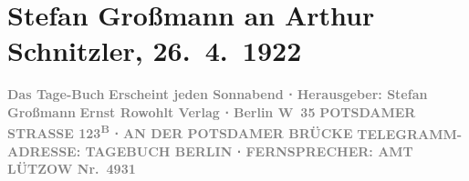 

         
         \newcommand{\erwaehntePersonen}{Personen: Felix Salten}
         \newcommand{\erwaehnteInstitutionen}{Institutionen: Das Tage-Buch, Ernst Rowohlt Verlag, Fernsprechamt Lietzow}
         \newcommand{\erwaehnteOrte}{Orte: Berlin, Deutschland, Potsdamerstraße, Wien, Österreich}
         \newcommand{\erwaehnteWerke}{Werke: Das Tage-Buch, Von der kleinen Liebe}
               \section[Stefan Großmann an Arthur Schnitzler, 26. 4. 1922]{ Stefan Großmann an Arthur Schnitzler, 26. 4. 1922}\nopagebreak{}\rehead{ }\begin{ledgroupsized}[t]{13cm}\normalsize\beginnumbering \toendnotes[C]{\smallbreak\pagebreak[2]} 
\toendnotes[C]{\smallbreak}\pstart
           \noindent{}\centering{}{\pb}\textcolor{gray}{\textbf{Das Tage-Buch}}\pend
           \pstart
           \noindent{}\centering{}\textcolor{gray}{\textbf{Erscheint jeden Sonnabend ⋅ Herausgeber: Stefan Großmann}}\pend
           \pstart
           \noindent{}\centering{}\textcolor{gray}{\textbf{Ernst Rowohlt Verlag ⋅ Berlin W 35}}\pend
           \pstart
           \noindent{}\centering{}\textcolor{gray}{\textbf{POTSDAMER STRASSE 123\textsuperscript{B}
                        ⋅ AN DER POTSDAMER BRÜCKE}}\pend
           \pstart
           \noindent{}\centering{}\textcolor{gray}{\textbf{TELEGRAMM-ADRESSE: TAGEBUCH
                        BERLIN ⋅ FERNSPRECHER: AMT LÜTZOW
                     Nr. 4931}}\pend
           \pstart

\end{ledgroupsized}
